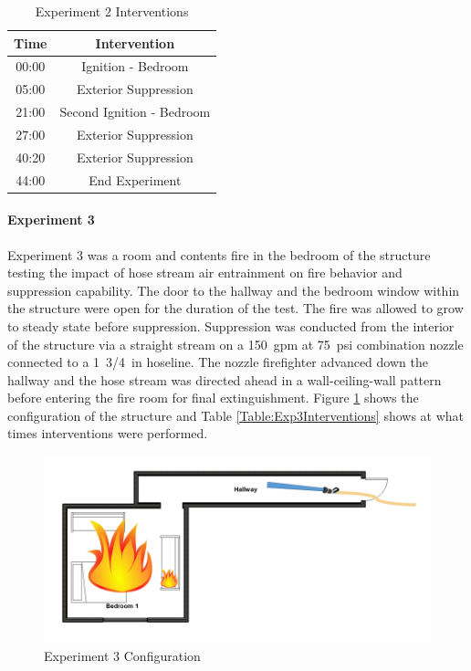 \documentclass[12pt,oneside]{book}
\begin{document}
\begin{table}[H]
	\centering
	\caption{Experiment 2 Interventions}
	\begin{tabular}{|c|c|} 
		\hline
		Time & Intervention \\ \hline \hline
		00:00 & Ignition - Bedroom \\ \hline
		05:00 & Exterior Suppression \\ \hline
		21:00 & Second Ignition - Bedroom \\ \hline
		27:00 & Exterior Suppression \\ \hline
		40:20 & Exterior Suppression \\ \hline
		44:00 & End Experiment\\ \hline
	\end{tabular}
	\label{Table:Exp2Interventions}
\end{table}

\clearpage

\paragraph{Experiment 3} \mbox{}

Experiment 3 was a room and contents fire in the bedroom of the structure testing the impact of hose stream air entrainment on fire behavior and suppression capability. The door to the hallway and the bedroom window within the structure were open for the duration of the test. The fire was allowed to grow to steady state before suppression. Suppression was conducted from the interior of the structure via a straight stream on a 150~gpm at 75~psi combination nozzle connected to a 1~3/4~in hoseline. The nozzle firefighter advanced down the hallway and the hose stream was directed ahead in a wall-ceiling-wall pattern before entering the fire room for final extinguishment. Figure \ref{fig:Exp3Config} shows the configuration of the structure and Table \ref{Table:Exp3Interventions} shows at what times interventions were performed.  


\begin{figure}[H]
	\centering
	\includegraphics[width=5in]{Howard_Exp_3.png}
	\caption{Experiment 3 Configuration}
	\label{fig:Exp3Config}
\end{figure}
\end{document}
